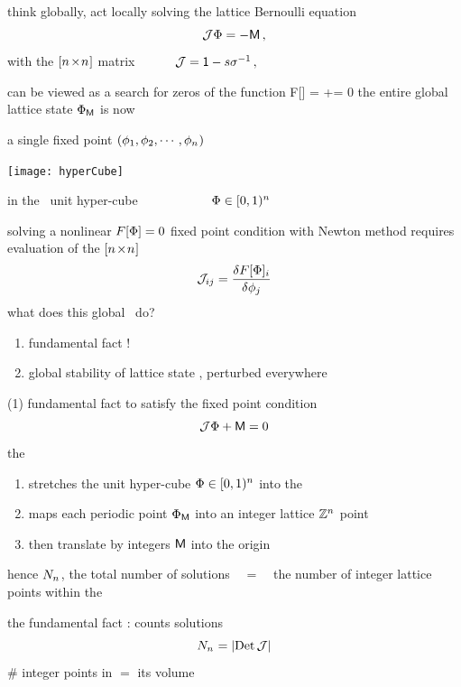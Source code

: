 \begin{frame}{think globally, act locally}
solving the {lattice Bernoulli} equation
\[
{\cal J}\Phi= -\mathsf{M}
\,,
\]
with
the $[{n_{}}\!\times\!{n_{}}]$ matrix ~~~~~
\(
{\cal J} = \mathsf{1}-{s}{\mathbf{\sigma}}^{-1}
\,,
\) %
\medskip

can be viewed as a search for zeros of the function
\beq
F[\Xx] = \jMorb\Xx+\Mm = 0
the entire {\color{blue}global lattice state} ${\Xx}_{\Mm}$ is now
\medskip

a single {\color{blue}fixed point}
$(\ssp_1,\ssp_{2},\cdots,\ssp_{\cl{}})$

\hfill\texttt{[image: hyperCube]}

\hfill
in the \cl{}\dmn\ unit hyper-cube ~~~~~~~~~~~$\Xx\in[0,1)^\cl{}$
\end{frame}

\begin{frame}{\jacobianOrb}
solving a nonlinear $F[\Xx]=0$ fixed point condition
with Newton method requires evaluation of
the $[\cl{}\!\times\!\cl{}]$ {\color{blue}\jacobianOrb}
\[
\jMorb_{ij} =\frac{\delta F[\Xx]_i}{\delta \ssp_j}
\] %
what does this global \jacobianOrb\ do?
\bigskip

\begin{enumerate}
              \item
fundamental fact !
              \item
global stability of lattice state \Xx, perturbed everywhere
            \end{enumerate}
\end{frame}

\begin{frame}{(1) fundamental fact}
to satisfy the fixed point condition
\[
{\cal J}\Phi+\mathsf{M} = 0
\]
the
 {\jacobianOrb} \jMorb\
\begin{enumerate}
              \item
stretches the unit hyper-cube $\Phi\in[0,1)^{n_{}}$ into the \cl{}\dmn\
{\color{blue}\fundPip}
              \item
maps each periodic point ${\Phi}_{\mathsf{M}}$ into an integer lattice
$\mathbb{Z}^{n_{}}$ point
              \item
then translate by integers $\mathsf{M}$ into the origin
            \end{enumerate}
hence $N_{n_{}}$, the total number of solutions ~~=~~ the number of
integer lattice points within the {\fundPip}

\bigskip

the {\color{blue}fundamental fact} :
{\color{blue}\HillDet} counts solutions
\[
N_{n_{}} = |\mbox{\rm Det}\,{\cal J}|
\] %
\# integer points in {\fundPip} $=$ its volume
\end{frame}

